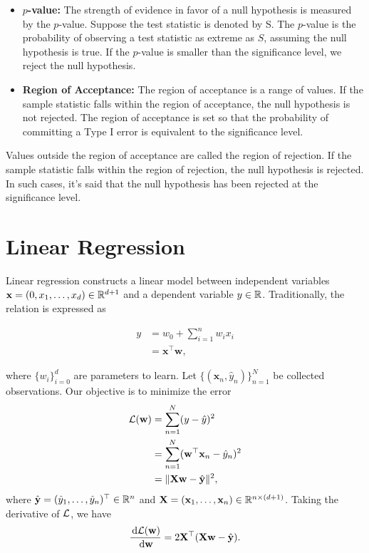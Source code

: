 \begin{itemize}
 \item \textbf{$p$-value:} The strength of evidence in favor of a null hypothesis is measured by the $p$-value. Suppose the test statistic is denoted by S. The $p$-value is the probability of observing a test statistic as extreme as $S$, assuming the null hypothesis is true. If the $p$-value is smaller than the significance level, we reject the null hypothesis.
 \item \textbf{Region of Acceptance:} The region of acceptance is a range of values. If the sample statistic falls within the region of acceptance, the null hypothesis is not rejected. The region of acceptance is set so that the probability of committing a Type I error is equivalent to the significance level.
\end{itemize}

Values outside the region of acceptance are called the region of rejection. If the sample statistic falls within the region of rejection, the null hypothesis is rejected. In such cases, it's said that the null hypothesis has been rejected at the  significance level.

\section{Linear Regression}
Linear regression constructs a linear model between independent variables $\mathbf{x}=(0, x_1,\ldots, x_d)\in\mathbb{R}^{d+1}$ and a dependent variable $y\in\mathbb{R}$. Traditionally, the relation is expressed as

\begin{equation}
 \begin{aligned}
  y
   & = w_0 + \sum\limits_{i=1}^n w_ix_i \\
   & = \mathbf{x}^\top\mathbf{w},
 \end{aligned}
\end{equation}

where $\{w_i\}_{i=0}^d$ are parameters to learn. Let $\{(\mathbf{x}_n, \hat{y}_n)\}_{n=1}^N$ be collected observations. Our objective is to minimize the error
\begin{equation}
 \begin{aligned}
  \mathcal{L}(\mathbf{w})
   & = \sum\limits_{n=1}^N (y-\hat{y})^2                                                              \\
   & = \sum\limits_{n=1}^N (\mathbf{w}^\top \mathbf{x}_n-\hat{y}_n)^2                                 \\
   & = \|\mathbf{X} \mathbf{w} - \hat{\mathbf{y}}\|^2                                               ,
 \end{aligned}
\end{equation}
where $\hat{\mathbf{y}} = (\hat{y}_1,\ldots,\hat{y}_n)^\top \in \mathbb{R}^n$ and $\mathbf{X} = (\mathbf{x}_1,\ldots,\mathbf{x}_n)\in\mathbb{R}^{n\times(d+1)}$.
Taking the derivative of $\mathcal{L}$, we have
$$\dfrac{\,\mathrm{d}\mathcal{L}(\mathbf{w})}{\,\mathrm{d} \mathbf{w}} = 2\mathbf{X}^\top(\mathbf{X} \mathbf{w} - \hat{\mathbf{y}}).$$

